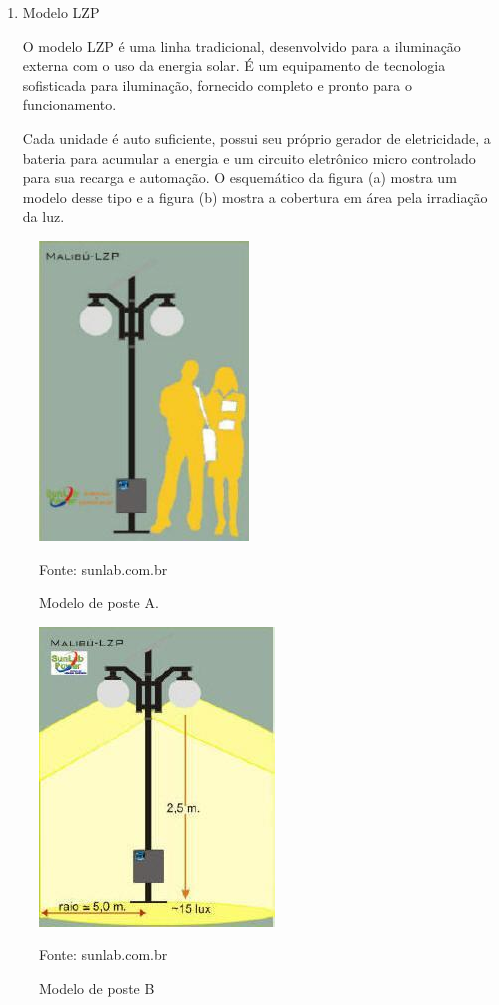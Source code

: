 \begin{itemize}
	\begin{enumerate}
		\item Modelo LZP
		
	O modelo LZP é uma linha tradicional, desenvolvido para a iluminação externa com o uso da energia solar. É um equipamento de tecnologia sofisticada para iluminação, fornecido completo e pronto para o funcionamento. \cite{SUNLAB} 

	Cada unidade é auto suficiente, possui seu próprio gerador de eletricidade,  a bateria para acumular a energia e um circuito eletrônico micro controlado para sua recarga e automação. O esquemático da figura (a) mostra um modelo desse tipo e a figura (b) mostra a cobertura em área pela irradiação da luz.
		
	\end{enumerate}
	
	\begin{figure}[H]
	 \centering
	\label{Modelo de poste A}
	 \includegraphics[keepaspectratio=true,scale=0.8]{postes/3.png}
	 \caption{Modelo de poste A.}
	 \small{Fonte: sunlab.com.br}
	\end{figure}
	
	\begin{figure}[H]
	 \centering
	\label{Modelo de poste B}
	 \includegraphics[keepaspectratio=true,scale=0.8]{postes/4.png}
	 \caption{Modelo de poste B}
	 \small{Fonte: sunlab.com.br}
	\end{figure}
		

\end{itemize}
